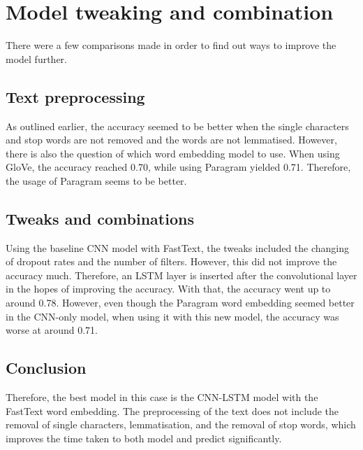 \documentclass[11pt,a4paper]{article}
\begin{document}
	\section{Model tweaking and combination}
	
	There were a few comparisons made in order to find out ways to improve the model further.
	
	\subsection{Text preprocessing}
	
	As outlined earlier, the accuracy seemed to be better when the single characters and stop words are not removed and the words are not lemmatised. However, there is also the question of which word embedding model to use. When using GloVe, the accuracy reached 0.70, while using Paragram yielded 0.71. Therefore, the usage of Paragram seems to be better.
	
	\subsection{Tweaks and combinations}
	
	Using the baseline CNN model with FastText, the tweaks included the changing of dropout rates and the number of filters. However, this did not improve the accuracy much. Therefore, an LSTM layer is inserted after the convolutional layer in the hopes of improving the accuracy. With that, the accuracy went up to around 0.78. However, even though the Paragram word embedding seemed better in the CNN-only model, when using it with this new model, the accuracy was worse at around 0.71.
	
	\subsection{Conclusion}
	
	Therefore, the best model in this case is the CNN-LSTM model with the FastText word embedding. The preprocessing of the text does not include the removal of single characters, lemmatisation, and the removal of stop words, which improves the time taken to both model and predict significantly.
	
\end{document}
